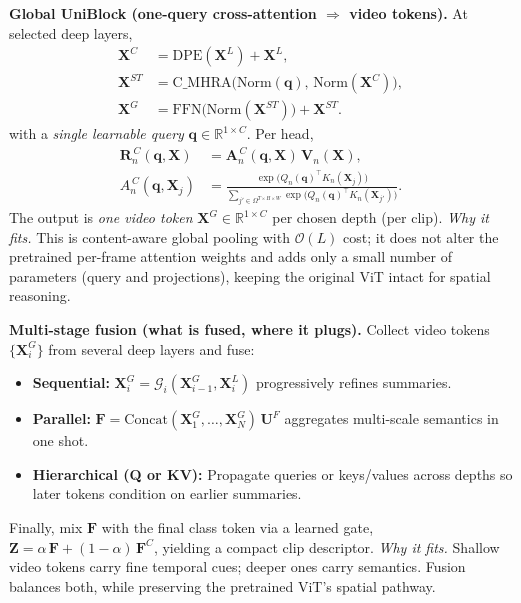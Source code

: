 \begin{enrichment}
\begin{enrichment}
        \textbf{Global UniBlock (one-query cross-attention \(\Rightarrow\) video tokens).} At selected deep layers,
        \begin{align}
            \bm{X}^{C}  &= \mathrm{DPE}(\bm{X}^{L}) + \bm{X}^{L}, \label{eq:uv2_dpe}\\
            \bm{X}^{ST} &= \mathrm{C\_MHRA}\big(\mathrm{Norm}(\bm{q}),\,\mathrm{Norm}(\bm{X}^{C})\big), \label{eq:uv2_cmhra}\\
            \bm{X}^{G}  &= \mathrm{FFN}\big(\mathrm{Norm}(\bm{X}^{ST})\big) + \bm{X}^{ST}. \label{eq:uv2_g_ffn}
        \end{align}
        with a \emph{single learnable query} \(\bm{q}\!\in\!\mathbb{R}^{1\times C}\). Per head,
        \begin{align}
            \bm{R}^{\,C}_n(\bm{q},\bm{X}) &= \bm{A}^{\,C}_n(\bm{q},\bm{X})\,\bm{V}_n(\bm{X}), \\
            A^{\,C}_n(\bm{q},\bm{X}_j) &=
            \frac{\exp\!\big(Q_n(\bm{q})^\top K_n(\bm{X}_j)\big)}
            {\sum_{j'\in\Omega^{T\times H\times W}}\exp\!\big(Q_n(\bm{q})^\top K_n(\bm{X}_{j'})\big)}.
            \label{eq:uv2_cross}
        \end{align}
        The output is \emph{one video token} \(\bm{X}^G\!\in\!\mathbb{R}^{1\times C}\) per chosen depth (per clip). \emph{Why it fits.} This is content-aware global pooling with \(\mathcal{O}(L)\) cost; it does not alter the pretrained per-frame attention weights and adds only a small number of parameters (query and projections), keeping the original ViT intact for spatial reasoning.
        
        \textbf{Multi-stage fusion (what is fused, where it plugs).} Collect video tokens \(\{\bm{X}^G_i\}\) from several deep layers and fuse:
        \begin{itemize}
            \item \textbf{Sequential:} \(\bm{X}^G_i \!=\! \mathcal{G}_i(\bm{X}^G_{i-1},\bm{X}^L_i)\) progressively refines summaries. 
            \item \textbf{Parallel:} \(\bm{F}=\mathrm{Concat}(\bm{X}^G_1,\dots,\bm{X}^G_N)\,\bm{U}^F\) aggregates multi-scale semantics in one shot. 
            \item \textbf{Hierarchical (Q or KV):} Propagate queries or keys/values across depths so later tokens condition on earlier summaries. 
        \end{itemize}
        Finally, mix \(\bm{F}\) with the final class token via a learned gate, \(\bm{Z}=\alpha\,\bm{F} + (1-\alpha)\,\bm{F}^{C}\), yielding a compact clip descriptor. \emph{Why it fits.} Shallow video tokens carry fine temporal cues; deeper ones carry semantics. Fusion balances both, while preserving the pretrained ViT’s spatial pathway.
        

\end{enrichment}
\end{enrichment}
